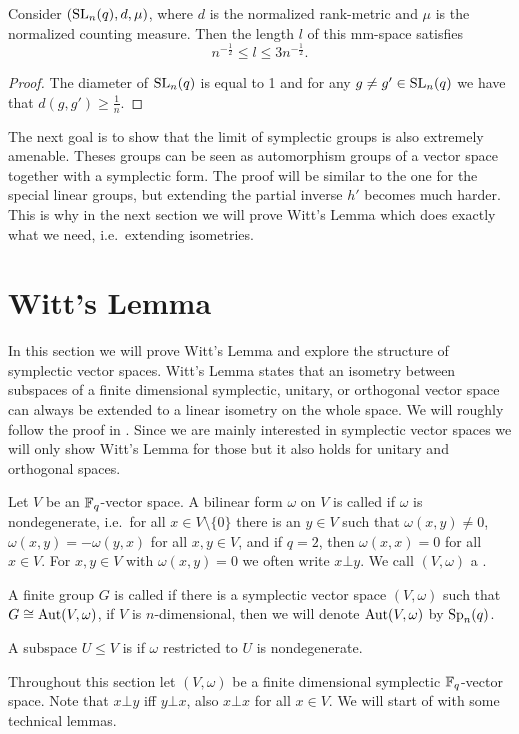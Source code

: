 \begin{corollary}
	Consider $(\operatorname{SL}_{n}(q),d,\mu)$, where $d$ is the normalized rank-metric and $\mu$ is the normalized counting measure. Then the length $l$ of this mm-space satisfies
	\[n^{-\frac{1}{2}}\leq l\leq 3n^{-\frac{1}{2}}.\]
\end{corollary}
\begin{proof}
	The diameter of $\operatorname{SL}_n(q)$ is equal to 1 and for any $g\not=g'\in\operatorname{SL}_n(q)$ we have that $d(g,g')\geq \frac1n$.
\end{proof}
		
The next goal is to show that the limit of symplectic groups is also extremely amenable. Theses groups can be seen as automorphism groups of a vector space together with a symplectic form. The proof will be similar to the one for the special linear groups, but extending the partial inverse $h'$ becomes much harder. This is why in the next section we will prove Witt's Lemma which does exactly what we need, i.e.\ extending isometries.
		
\section{Witt's Lemma}\label{sec:witt}
In this section we will prove Witt's Lemma and explore the structure of symplectic vector spaces. Witt's Lemma states that an isometry between subspaces of a finite dimensional symplectic, unitary, or orthogonal vector space can always be extended to a linear isometry on the whole space.  We will roughly follow the proof in \cite{Witt}. Since we are mainly interested in symplectic vector spaces we will only show Witt's Lemma for those but it also holds for unitary and orthogonal spaces.
		
\begin{definition}
	Let $V$ be an $\mathbb{F}_q$-vector space. A bilinear form $\omega$ on $V$ is called  if $\omega$ is nondegenerate, i.e.\ for all $x\in V\setminus\{0\}$ there is an $y\in V$ such that $\omega(x,y)\not=0$, $\omega(x,y)=-\omega(y,x)$ for all $x,y\in V$, and if $q=2$, then $\omega(x,x)=0$ for all $x\in V$. For $x,y\in V$ with $\omega(x,y)=0$ we often write $x\bot y$. We call $(V,\omega)$ a .
				
	A finite group $G$ is called  if there is a symplectic vector space $(V,\omega)$ such that $G\cong\operatorname{Aut}(V,\omega)$, if $V$ is $n$-dimensional, then we will denote $\operatorname{Aut}(V,\omega)$ by $\operatorname{Sp}_n(q)$. 
				
	A subspace $U\leq V$ is  if $\omega$ restricted to $U$ is nondegenerate. %
\end{definition}
Throughout this section let $(V,\omega)$ be a finite dimensional symplectic $\mathbb{F}_q$-vector space.
Note that $x\bot y$ iff $y \bot x$, also $x\bot x$ for all $x\in V$.
We will start of with some technical lemmas.
		
